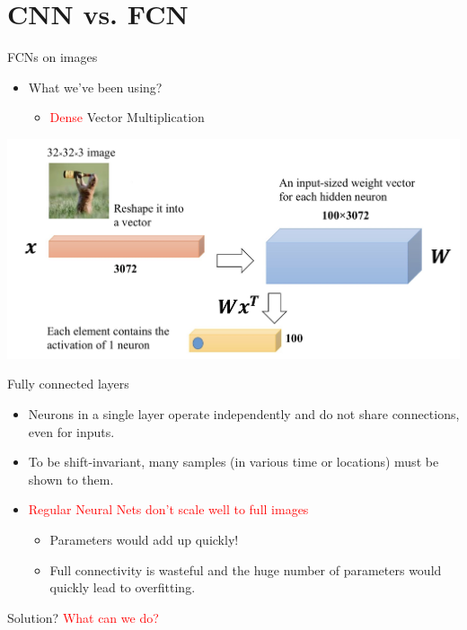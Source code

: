 \documentclass[default, aspectratio=169]{beamer}
\begin{document}
	
	
	\section{CNN vs. FCN}
	\begin{frame}{FCNs on images}
		\begin{itemize}
			\item What we've been using?
			\begin{itemize}
				\item \textcolor{red}{Dense} Vector Multiplication
			\end{itemize}
		\end{itemize}
		\begin{center}
			\includegraphics[keepaspectratio, scale=0.18]{pic/Processing images.jpg}
		\end{center}
	\end{frame}
	\begin{frame}{Fully connected layers}
		\begin{itemize}
			\item Neurons in a single layer operate independently and do not share connections, even for inputs.
			
			\bigskip
			
			\item To be shift-invariant, many samples (in various time or locations) must be shown to them.
			
			\bigskip
			
			\item \textcolor{red}{Regular Neural Nets don’t scale well to full images}
			\begin{itemize}
				\item Parameters would add up quickly!
				\item Full connectivity is wasteful and the huge number of parameters would quickly lead to overfitting.
			\end{itemize}
		\end{itemize}
	\end{frame}
	\begin{frame}{Solution?}
		\centering
		\large \textcolor{red}{What can we do?}
	\end{frame}
	
\end{document}
